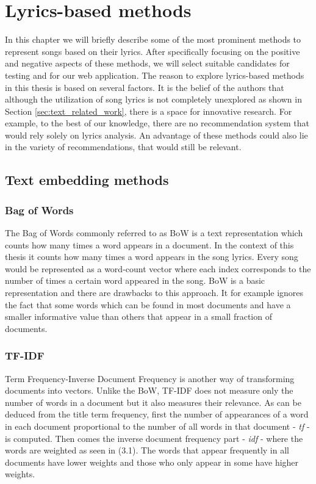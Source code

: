 \chapter{Lyrics-based methods}\label{chap:lyrics_methods}
 In this chapter we will briefly describe some of the most prominent methods to represent songs based on their lyrics. After specifically focusing on the positive and negative aspects of these methods, we will select suitable candidates for testing and for our web application. The reason to explore lyrics-based methods in this thesis is based on several factors. It is the belief of the authors that although the utilization of song lyrics is not completely unexplored as shown in Section \ref{sec:text_related_work}, there is a space for innovative research. For example, to the best of our knowledge, there are no recommendation system that would rely solely on lyrics analysis. An advantage of these methods could also lie in the variety of recommendations, that would still be relevant.

\section{Text embedding methods}
\subsection{Bag of Words}
The Bag of Words commonly referred to as BoW is a text representation which counts how many times a word appears in a document. In the context of this thesis it counts how many times a word appears in the song lyrics.
Every song would be represented as a word-count vector where each index corresponds to the number of times a certain word appeared in the song. BoW is a basic representation and there are drawbacks to this approach. It for example ignores the fact that some words which can be found in most documents and have a smaller informative value than others that appear in a small fraction of documents. 
\subsection{TF-IDF}
Term Frequency-Inverse Document Frequency is another way of transforming documents into vectors. Unlike the BoW, TF-IDF does not measure only the number of words in a document but it also measures their relevance. As can be deduced from the title term frequency, first the number of appearances of a word in each document proportional to the number of all words in that document - \textit{tf} - is computed. Then comes the inverse document frequency part - \textit{idf} - where the words are weighted as seen in (3.1). The words that appear frequently in all documents have lower weights and those who only appear in some have higher weights.

